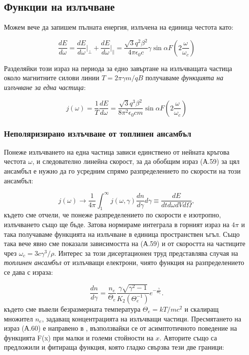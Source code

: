 \begin{appendices}
\subsection{Функции на излъчване}

Можем вече да запишем пълната енергия, излъчена на единица честота като:

\begin{equation}
	\frac{dE}{d\omega}= \frac{dE}{d\omega}\bigg\vert_\perp  + \frac{dE}{d\omega}\bigg\vert_\parallel = \frac{\sqrt{3}q^2\beta^2}{4\pi\epsilon_0c}\gamma\sin\alpha F\left(2\frac{\omega}{\omega_c}\right)
\end{equation}

Разделяйки този израз на периода за едно завъртане на излъчващата частица около магнитните силови линии $T = 2\pi\gamma m/qB$ получаваме \emph{функцията на излъчване за една частица}:

\begin{equation}
	j(\omega) = \frac{1}{T}\frac{dE}{d\omega} = \frac{\sqrt{3}q^3\beta^2}{8\pi^2\epsilon_0cm}\sin\alpha F\left(2\frac{\omega}{\omega_c}\right)
\end{equation}

\subsubsection{Неполяризирано излъчване от топлинен ансамбъл}

Понеже излъчването на една частица зависи единствено от нейната кръгова честота $\omega$, и следователно линейна скорост, за да обобщим израз (А.59) за цял ансамбъл е нужно да го усредним спрямо разпределението по скорости на този ансамбъл:

\begin{equation}
	j(\omega) \rightarrow \frac{1}{4\pi}\int_1^\infty j(\omega, \gamma) \frac{dn}{d\gamma} d\gamma \equiv \frac{dE}{dtd\omega dV d\Omega},
\end{equation}
където сме отчели, че понеже разпределението по скорости е изотропно, излъчването също ще бъде. Затова нормираме интеграла в горният израз на $4\pi$ и така получаваме функцията на излъчване в единица пространствен ъгъл. Също така вече явно сме показали зависимостта на (А.59) и от скоростта на частиците чрез $\omega_c = 3c\gamma^3/\rho$. Интерес за този дисертационен труд представлява случая на \emph{топлинен ансамбъл} от излъчващи електрони, чиято функция на разпределението се дава с израза:

\begin{equation}
	\frac{dn}{d\gamma} = \frac{n_e}{\Theta_e}\frac{\gamma\sqrt{\gamma^2 - 1}}{K_2(\Theta_e^{-1})}e^{-\frac{\gamma}{\Theta_e}}.
\end{equation}
където сме въвели безразмерната температура $\Theta_e = kT / mc^2$ и скалиращ множител $n_e$, задаващ концентрацията на излъчващи частици. Пресмятането на израз (А.60) е направено в \cite{Leung2011}, възползвайки се от асимптотичното поведение на функцията F(x) при малки и големи стойности на $x$. Авторите \cite{Leung2011} също са предложили и фитираща функция, която гладко свързва тези две граници:


\end{appendices}
